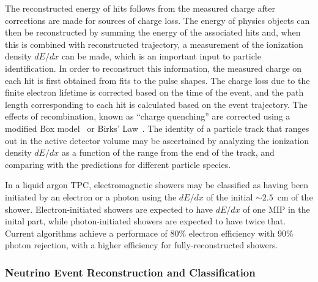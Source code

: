The reconstructed energy of hits follows from the measured charge 
after corrections are made for sources of charge loss. 
The energy of physics objects can then be reconstructed by summing 
the energy of the associated hits and, when this is combined with 
reconstructed trajectory, a measurement of the
ionization density $dE/dx$ can be made, which is an important input 
to particle identification.
In order to reconstruct this information, the measured charge on each hit 
is first obtained from fits to the pulse shapes.
The charge loss due to the finite electron lifetime is corrected
based on the time of the event, and the path length corresponding
to each hit is calculated based on the event trajectory.
The effects of recombination, known as ``charge quenching''
are corrected using a modified Box model~\cite{Thomas:1987zz} 
or Birks' Law~\cite{Birks:1964zz}.
The identity of a particle track that ranges out in the active detector volume
may be ascertained by analyzing the ionization density $dE/dx$ as a function of 
the range from the end of the track, and comparing with the predictions
for different particle species. 

In a liquid argon TPC, electromagnetic showers may be classified as having been initiated by
an electron or a photon using the $dE/dx$ of the initial $\sim 2.5$~cm of the shower.  Electron-initiated
showers are expected to have $dE/dx$ of one MIP in the inital part, while photon-initiated showers
are expected to have twice that.  Current algorithms achieve a performace of 80\% electron efficiency
with 90\% photon rejection, with a higher efficiency for fully-reconstructed showers.



\subsubsection{Neutrino Event Reconstruction and Classification}

